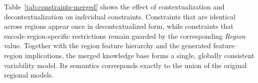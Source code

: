 \documentclass{ceurart}
\begin{document}
Table~\ref{tab:constraints-merged} shows the effect of contextualization and decontextualization on individual
constraints. Constraints that are identical
across regions appear once in decontextualized form, while
constraints that encode region-specific restrictions remain guarded
by the corresponding \textit{Region} value. Together with the region
feature hierarchy and the generated feature--region implications, the
merged knowledge base forms a single, globally consistent variability
model. Its semantics corresponds exactly to the union of the
original regional models.

\begin{table}[h]
\caption{Merged feature tree (fragment) and selected cross-tree constraints.}
\label{tab:constraints-merged}
\centering
{}
\end{table}
\end{document}
